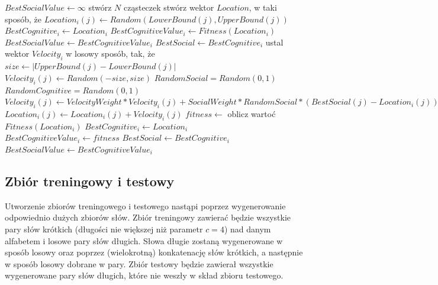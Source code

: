 \documentclass{../llncs_template_final/llncs}
\begin{document}
\begin{algorithm}
\begin{algorithmic}[1]
    \State $BestSocialValue \gets \infty$
    \State stwórz $N$ cząsteczek
        \State stwórz wektor $Location$, w taki sposób, że
            \State $Location_i(j) \gets Random(LowerBound(j), UpperBound(j))$
        \EndFor
        \State $BestCognitive_i \gets Location_i$
        \State $BestCognitiveValue_i \gets Fitness(Location_i)$
            \State $BestSocialValue \gets BestCognitiveValue_i$
            \State $BestSocial  \gets BestCognitive_i$
        \EndIf
        \State ustal wektor $Velocity_i$ w losowy sposób, tak, że
            \State $size \gets |UpperBound(j) - LowerBound(j)|$
            \State $Velocity_i(j) \gets Random(-size, size)$
        \EndFor
    \EndFor
                \State $RandomSocial = Random(0, 1)$
                \State $RandomCognitive = Random(0, 1)$
                \State $Velocity_i(j) \gets VelocityWeight * Velocity_i(j) + SocialWeight * RandomSocial * (BestSocial(j) - Location_i(j)) + CognitiveWeight * RandomCognitive * (BestCognitive_i(j) - Location_i(j))$
                \State $Location_i(j) \gets Location_i(j) + Velocity_i(j)$
            \EndFor
            \State $fitness \gets$ oblicz wartoć $Fitness(Location_i)$
                \State $BestCognitive_i \gets Location_i$
                \State $BestCognitiveValue_i \gets fitness$
                    \State $BestSocial \gets BestCognitive_i$
                    \State $BestSocialValue \gets BestCognitiveValue_i$
                \EndIf
            \EndIf
        \EndFor
    \EndFor
    \State {}
\EndProcedure
\end{algorithmic}
\caption{PSO}\label{alg:pso}
\end{algorithm}


\newpage

\subsection{Zbiór treningowy i testowy}

Utworzenie zbiorów treningowego i testowego nastąpi poprzez wygenerowanie odpowiednio dużych zbiorów słów. Zbiór treningowy zawierać będzie wszystkie pary słów krótkich (długości nie większej niż parametr $c = 4$) nad danym alfabetem i losowe pary słów długich. Słowa długie zostaną wygenerowane w sposób losowy oraz poprzez (wielokrotną) konkatenację słów krótkich, a następnie w sposób losowy dobrane w pary. Zbiór testowy będzie zawierał wszystkie wygenerowane pary słów długich, które nie weszły w skład zbioru testowego. 
\end{document}
